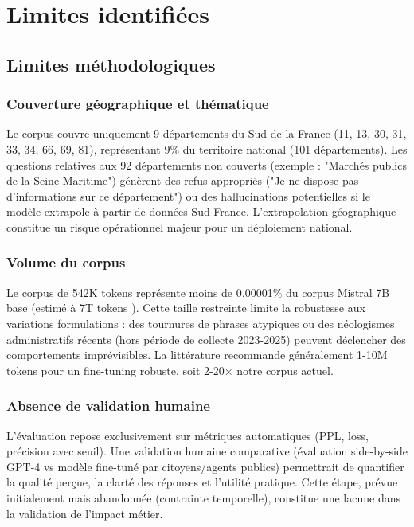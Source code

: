 \section{Limites identifiées}

\subsection{Limites méthodologiques}

\subsubsection{Couverture géographique et thématique}

Le corpus couvre uniquement 9 départements du Sud de la France (11, 13, 30, 31, 33, 34, 66, 69, 81), représentant 9\% du territoire national (101 départements). Les questions relatives aux 92 départements non couverts (exemple : "Marchés publics de la Seine-Maritime") génèrent des refus appropriés ("Je ne dispose pas d'informations sur ce département") ou des hallucinations potentielles si le modèle extrapole à partir de données Sud France. L'extrapolation géographique constitue un risque opérationnel majeur pour un déploiement national.

\subsubsection{Volume du corpus}

Le corpus de 542K tokens représente moins de 0.00001\% du corpus Mistral 7B base (estimé à 7T tokens \citep{jiang2023mistral}). Cette taille restreinte limite la robustesse aux variations formulations : des tournures de phrases atypiques ou des néologismes administratifs récents (hors période de collecte 2023-2025) peuvent déclencher des comportements imprévisibles. La littérature recommande généralement 1-10M tokens pour un fine-tuning robuste, soit 2-20× notre corpus actuel.

\subsubsection{Absence de validation humaine}

L'évaluation repose exclusivement sur métriques automatiques (PPL, loss, précision avec seuil). Une validation humaine comparative (évaluation side-by-side GPT-4 vs modèle fine-tuné par citoyens/agents publics) permettrait de quantifier la qualité perçue, la clarté des réponses et l'utilité pratique. Cette étape, prévue initialement mais abandonnée (contrainte temporelle), constitue une lacune dans la validation de l'impact métier.


